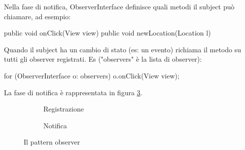 Nella fase di notifica, ObserverInterface definisce quali metodi il subject può chiamare, ad esempio: 
\begin{Java}
    public void onClick(View view)
    public void newLocation(Location l)
\end{Java}

Quando il subject ha un cambio di stato (es: un evento) richiama il metodo su tutti gli observer registrati. Es ("observers" è la lista di observer):
\begin{Java}
    for (ObserverInterface o: observers) {
        o.onClick(View view);
    }
\end{Java}
La fase di notifica è rappresentata in figura \ref{fig:notifica}.

\begin{figure}[!h]
\centering
\begin{subfigure}[h]{0.5\textwidth}
    \centering
    \caption{Registrazione}
    \label{fig:registrazione}
\end{subfigure}\hfill
\quad
\begin{subfigure}[h]{0.5\textwidth}
    \centering
    \caption{Notifica}
    \label{fig:notifica}
\end{subfigure}\hfill
\caption{Il pattern observer}
\end{figure}


